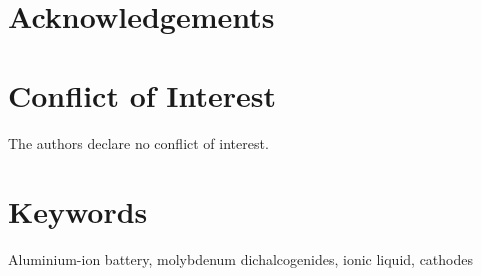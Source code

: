 \section*{Acknowledgements}
\section*{Conflict of Interest}
The authors declare no conflict of interest.
\section*{Keywords}
Aluminium-ion battery, molybdenum dichalcogenides, ionic liquid, cathodes
%
\newpage
\newpage
\printendnotes

